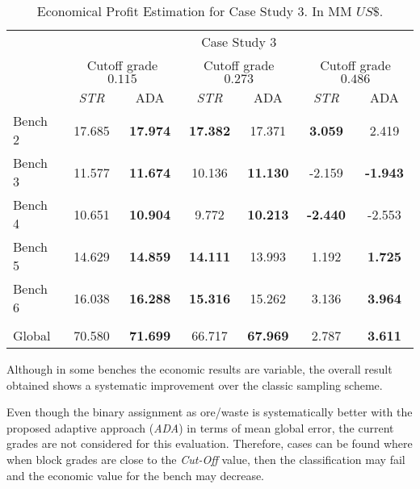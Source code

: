 \begin{table}
	\caption[Economic Profit Estimation for Case Study 3]{Economical Profit Estimation for Case Study 3. In MM $US\$$.}
	\label{tab:profit_global_classification_cs3_PII}
	\begin{center}
		\footnotesize
		\begin{tabular}{lcccccc}\toprule
			& \multicolumn{6}{c}{Case Study 3} \\
			& \multicolumn{2}{c}{Cutoff grade $0.115$}& \multicolumn{2}{c}{Cutoff grade $0.273$} & \multicolumn{2}{c}{Cutoff grade $0.486$} \\
			& {\emph{STR}} & {ADA} & {\emph{STR}} & {ADA} & {\emph{STR}} & {ADA}\\\midrule
			Bench 2 &  17.685 &  \textbf{17.974} &   \textbf{17.382}  &  17.371  &   \textbf{3.059} &  2.419\\
			Bench 3 &  11.577 &  \textbf{11.674} &  10.136 &  \textbf{11.130} &  -2.159 &  \textbf{-1.943} \\
			Bench 4 &  10.651 &  \textbf{10.904} &  9.772 &  \textbf{10.213} &  \textbf{-2.440} &  -2.553\\
			Bench 5 &  14.629 &  \textbf{14.859} &  \textbf{14.111}  &   13.993 &   1.192 &  \textbf{1.725}\\
			Bench 6 &  16.038 &  \textbf{16.288} &  \textbf{15.316} &  15.262 &  3.136 &  \textbf{3.964}\\
			\hline \\
			Global  &  70.580 &  \textbf{71.699} &  66.717 &  \textbf{67.969} &  2.787 &  \textbf{3.611} \\
			\bottomrule
		\end{tabular}
	\end{center}
\end{table}

Although in some benches the economic results are variable, the overall result obtained shows a systematic improvement over the classic sampling scheme. %

Even though the binary assignment as ore/waste is systematically better with the proposed adaptive approach (\emph{ADA}) in terms of mean global error, the current grades are not considered for this evaluation. Therefore, cases can be found where when block grades are close to the \emph{Cut-Off} value, then the classification may fail and the economic value for the bench may decrease.

